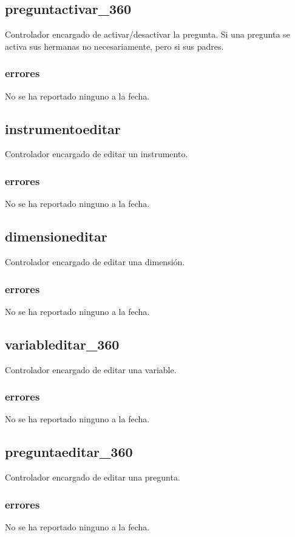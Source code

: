 \documentclass[10pt,a4paper]{book}
\begin{document}
	\subsection{preguntactivar\_360}
	Controlador encargado de activar/desactivar la pregunta. Si una pregunta se activa sus hermanas no necesariamente, pero si sus padres.
	\subsubsection{errores}
	No se ha reportado ninguno a la fecha.

	\subsection{instrumentoeditar}
	Controlador encargado de editar un instrumento.
	\subsubsection{errores}
	No se ha reportado ninguno a la fecha.

	\subsection{dimensioneditar}
	Controlador encargado de editar una dimensión.
	\subsubsection{errores}
	No se ha reportado ninguno a la fecha.

	\subsection{variableditar\_360}
	Controlador encargado de editar una variable.
	\subsubsection{errores}
	No se ha reportado ninguno a la fecha.

	\subsection{preguntaeditar\_360}
	Controlador encargado de editar una pregunta.
	\subsubsection{errores}
	No se ha reportado ninguno a la fecha.
\end{document}
